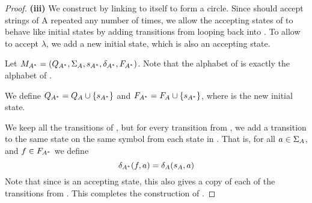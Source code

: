 \documentclass{bcthesis}
\begin{document}
\begin{proof}
		\noindent \textbf{(iii)} \hspace{\parindent}
		We construct \mas by linking \ma to itself to form a circle. %
		Since \mas should accept strings of A repeated any number of times, we allow the accepting states of \ma to behave like initial states by adding transitions from \fa looping back into \ma.
		To allow \mas to accept $\lambda$, we add a new initial state, which is also an accepting state.

		Let $M_{A^*} = (Q_{A^*}, \Sigma_A, s_{A^*}, \delta_{A^*}, F_{A^*})$.
		Note that the alphabet of \mas is exactly the alphabet of \ma.

		We define $Q_{A^*} = Q_A \cup \{ s_{A^*} \}$ and $F_{A^*} = F_A \cup \{ s_{A^*} \}$, where \sas is the new initial state.

		We keep all the transitions of \ma, but for every transition from \sa, we add a transition to the same state on the same symbol from each state in \fas.
		That is, for all $a \in \Sigma_A$, and $f \in F_{A^*}$ we define 
		\[
			\delta_{A^*}(f, a) = \delta_A(s_A, a)
		\]
		Note that since \sas is an accepting state, this also gives \sas a copy of each of the transitions from \sa.
		This completes the construction of \mas.
	\end{proof}
\end{document}
